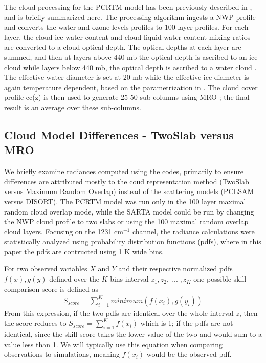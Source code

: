 \documentclass[agupp]{aguplus}              %
\newcommand{\wn}{cm$^{-1}$\xspace}
\begin{document}
\begin{article}
The cloud processing for the PCRTM model has been previously described
in \cite{chen:13}, and is briefly summarized here. The processing
algorithm ingests a NWP profile and converts the water and ozone
levels profiles to 100 layer profiles. For each layer, the cloud ice
water content and cloud liquid water content mixing ratios are
converted to a cloud optical depth. The optical depths at each layer
are summed, and then at layers above 440 mb the optical depth is
ascribed to an ice cloud while layers below 440 mb, the optical depth
is ascribed to a water cloud \citep{isccp,isccp2}.  The effective
water diameter is set at 20 mb while the effective ice diameter is
again temperature dependent, based on the parametrization in
\citep{ou:95}.  The cloud cover profile cc(z) is then used to generate
25-50 sub-columns using MRO \citep{chen:13}; the final result is an
average over these sub-columns.

\subsection{Cloud Model Differences - TwoSlab versus MRO}

We briefly examine radiances computed using the codes, primarily to
ensure differences are attributed mostly to the coud representation
method (TwoSlab versus Maximum Random Overlap) instead of the
scattering models (PCLSAM versus DISORT). The PCRTM model was run only
in the 100 layer maximal random cloud overlap mode, while the SARTA
model could be run by changing the NWP cloud profile to two slabs or
using the 100 maximal random overlap cloud layers. Focusing on the
1231 \wn channel, the radiance calculations were statistically
analyzed using probability distribution functions (pdfs), where in
this paper the pdfs are contructed using 1 K wide bins.

For two observed variables $X$ and $Y$ and their respective normalized
pdfs $f(x), g(y)$ defined over the $K$-bins interval $z_1,z_2, \;
... \; ,z_K$ one possible skill comparison score \citep{per:07} is
defined as 
\begin{eqnarray} 
S_{score} = \sum_{i=1}^K minimum(f(x_i),g(y_i))
\end{eqnarray} 
From this expression, if the two pdfs are identical over the whole
interval $z$, then the score reduces to $S_{score} = \sum_{i=1}^K f(x_i)$ 
which is 1; if the pdfs are not identical, since the skill
score takes the lower value of the two and would sum to a value less
than 1. We will typically use this equation when comparing
observations to simulations, meaning $f(x_i)$ would be the observed
pdf.


\end{article}
\end{document}
